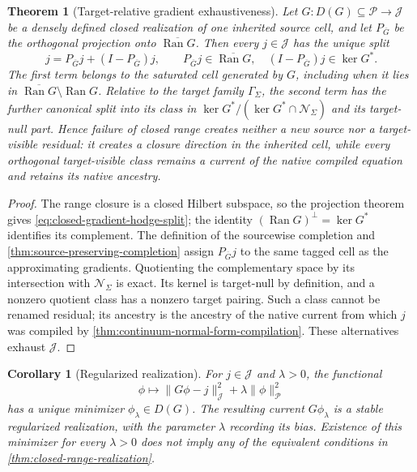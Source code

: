 \documentclass[11pt]{article}
\numberwithin{section}{part}
\theoremstyle{plain}
\newtheorem{theorem}{Theorem}[section]
\newtheorem{corollary}[corollary]{Corollary}
\theoremstyle{definition}
\theoremstyle{remark}
\newcommand{\Null}{\mathscr N}
\newcommand{\Ran}{\operatorname{Ran}}
\begin{document}
\begin{theorem}[Target-relative gradient exhaustiveness]
\label{thm:target-relative-gradient-exhaustiveness}
Let \(G:D(G)\subseteq\mathcal P\to\mathcal J\) be a densely defined closed
realization of one inherited source cell, and let
\(P_{\overline G}\) be the orthogonal projection onto
\(\overline{\Ran G}\).  Then every \(j\in\mathcal J\) has the unique split
\begin{equation}
 \label{eq:closed-gradient-hodge-split}
 j=P_{\overline G}j+(I-P_{\overline G})j,
 \qquad
 P_{\overline G}j\in\overline{\Ran G},
 \quad (I-P_{\overline G})j\in\ker G^*.
\end{equation}
The first term belongs to the saturated cell generated by \(G\), including
when it lies in \(\overline{\Ran G}\setminus\Ran G\).  Relative to the
target family \(\Gamma_\Sigma\), the second term has the further canonical
split into its class in
\(\ker G^*/(\ker G^*\cap\Null_\Sigma)\) and its target-null part.  Hence
failure of closed range creates neither a new source nor a target-visible
residual: it creates a closure direction in the inherited cell, while every
orthogonal target-visible class remains a current of the native compiled
equation and retains its native ancestry.
\end{theorem}

\begin{proof}
The range closure is a closed Hilbert subspace, so the projection theorem
gives \eqref{eq:closed-gradient-hodge-split}; the identity
\((\Ran G)^\perp=\ker G^*\) identifies its complement.  The definition of
the sourcewise completion and
\cref{thm:source-preserving-completion} assign
\(P_{\overline G}j\) to the same tagged cell as the approximating gradients.
Quotienting the complementary space by its intersection with
\(\Null_\Sigma\) is exact.  Its kernel is target-null by definition, and a
nonzero quotient class has a nonzero target pairing.  Such a class cannot be
renamed residual; its ancestry is the ancestry of the native current from
which \(j\) was compiled by
\cref{thm:continuum-normal-form-compilation}.  These alternatives exhaust
\(\mathcal J\).
\end{proof}

\begin{corollary}[Regularized realization]
\label{cor:regularized-source-realization}
For \(j\in\mathcal J\) and \(\lambda>0\), the functional
\[
 \phi\longmapsto
 \|G\phi-j\|_{\mathcal J}^{2}+\lambda\|\phi\|_{\mathcal P}^{2}
\]
has a unique minimizer \(\phi_\lambda\in D(G)\).  The resulting current
\(G\phi_\lambda\) is a stable regularized realization, with the parameter
\(\lambda\) recording its bias.  Existence of this minimizer for every
\(\lambda>0\) does not imply any of the equivalent conditions in
\cref{thm:closed-range-realization}.
\end{corollary}
\end{document}
